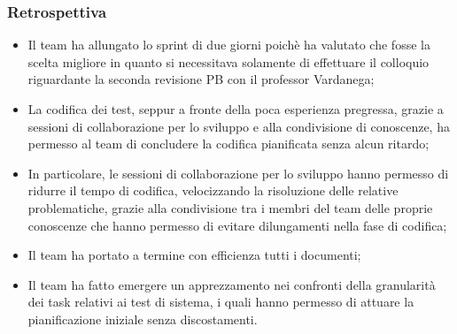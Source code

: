 \documentclass[10pt, a4paper]{article}
\begin{document}
\subsubsection{Retrospettiva}
\begin{itemize}
    \item Il team ha allungato lo sprint di due giorni poichè ha valutato che fosse la scelta migliore in quanto si necessitava solamente di effettuare il colloquio riguardante la seconda revisione PB con il professor Vardanega;
    \item La codifica dei test, seppur a fronte della poca esperienza pregressa, grazie a sessioni di collaborazione per lo sviluppo e alla condivisione di conoscenze, ha permesso al team di concludere la codifica pianificata senza alcun ritardo;
    \item In particolare, le sessioni di collaborazione per lo sviluppo hanno permesso di ridurre il tempo di codifica, velocizzando la risoluzione delle relative problematiche, grazie alla condivisione tra i membri del team delle proprie conoscenze che hanno permesso di evitare dilungamenti nella fase di codifica;
    \item Il team ha portato a termine con efficienza tutti i documenti;
    \item Il team ha fatto emergere un apprezzamento nei confronti della granularità dei task relativi ai test di sistema, i quali hanno permesso di attuare la pianificazione iniziale senza discostamenti.
\end{itemize}
\end{document}
